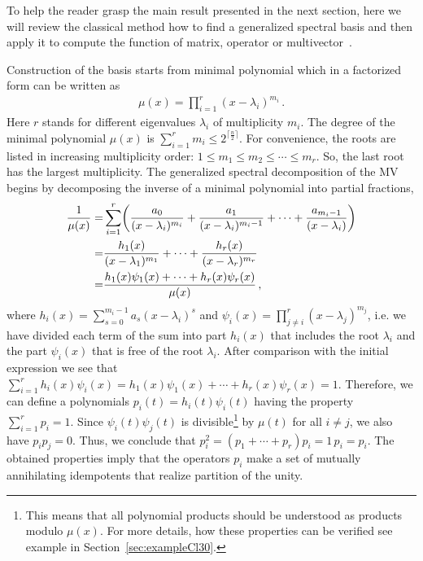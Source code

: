 \documentclass[AMA,STIX1COL]{WileyNJD-v2}
\begin{document}
To help the reader grasp the main result presented in the next
section, here  we will review the classical method how to find  a
generalized spectral basis and then apply it to compute the function of matrix,
operator or multivector~\cite{Sobczyk1997}.

Construction of the basis starts from minimal polynomial which
in a factorized form can be written as
\begin{align}\label{cl:minpolyfactored}
  \mu(x) =\prod_{i=1}^r(x-\lambda_i)^{m_i}\,.
\end{align}
Here $r$ stands for different eigenvalues $\lambda_i$ of
multiplicity $m_i$. The degree of the minimal polynomial $\mu(x)$ is
$\sum_{i=1}^r m_i \le 2^{\lceil\tfrac{n}{2}\rceil}$. For
convenience, the roots are listed in increasing multiplicity order:
$1\le m_1\le m_2\le\cdots\le m_r$. So, the last root has the
largest multiplicity. The generalized spectral decomposition of
the MV begins by decomposing the  inverse of a minimal polynomial
into partial fractions,
\begin{align}\label{cl:minpolyPFD}
  \frac{1}{\mu(x)} =&\sum_{i=1}^r \biggl(\frac{a_0}{(x-\lambda_i)^{m_i}}+\frac{a_1}{(x-\lambda_i)^{m_i-1}}+\cdots + \frac{a_{m_i-1}}{(x-\lambda_i)} \biggr)\notag \\
  =&\frac{h_1(x)}{(x-\lambda_1)^{m_1}}+\cdots + \frac{h_{r}(x)}{(x-\lambda_r)^{m_r}}\notag \\
   =&\frac{h_1(x)\psi_1(x)+\cdots + h_r(x)\psi_r(x)}{\mu(x)}\,,
\end{align}
where $h_i(x)=\sum_{s=0}^{m_i-1} a_s (x-\lambda_i)^s$ and $\psi_i(x)=\prod_{j\neq i}^r(x-\lambda_j)^{m_j}$, i.e. we have divided each
term of the sum into part $h_i(x)$ that includes the root $\lambda_i$ and the part $\psi_i(x)$ that is free of the root $\lambda_i$. After
comparison with the initial expression we see that $\sum_{i=1}^r h_i(x)\psi_i(x)= h_1(x)\psi_1(x)+\cdots + h_r(x)\psi_r(x)=1$. Therefore, we can
define a polynomials $p_i(t)= h_i(t)\psi_i(t)$ having the property $\sum_{i=1}^r p_i=1$. Since  $\psi_i(t)\psi_j(t)$ is divisible\footnote{This
means that all polynomial products should be  understood as products modulo $\mu(x)$. For more details, how these properties can be verified see
example in Section~\ref{sec:exampleCl30}.} by  $\mu(t)$ for all $i\neq j$, we also have $p_i p_j=0$. Thus, we conclude that $p_i^2=(p_1+\cdots
+p_r)p_i=1\, p_i=p_i$. The obtained properties imply that the operators $p_i$ make a set of mutually annihilating idempotents that realize
partition of the unity.
\end{document}
